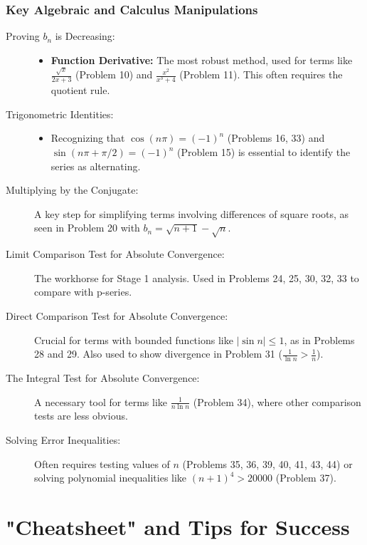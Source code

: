\documentclass{article}
\begin{document}
\section{Key Algebraic and Calculus Manipulations}
\begin{description}
    \item[Proving $b_n$ is Decreasing:]
    \begin{itemize}
        \item \textbf{Function Derivative:} The most robust method, used for terms like $\frac{\sqrt{x}}{2x+3}$ (Problem 10) and $\frac{x^2}{x^3+4}$ (Problem 11). This often requires the quotient rule.
    \end{itemize}
    
    \item[Trigonometric Identities:]
    \begin{itemize}
        \item Recognizing that $\cos(n\pi) = (-1)^n$ (Problems 16, 33) and $\sin(n\pi + \pi/2) = (-1)^n$ (Problem 15) is essential to identify the series as alternating.
    \end{itemize}
    
    \item[Multiplying by the Conjugate:] A key step for simplifying terms involving differences of square roots, as seen in Problem 20 with $b_n = \sqrt{n+1} - \sqrt{n}$.
    
    \item[Limit Comparison Test for Absolute Convergence:] The workhorse for Stage 1 analysis. Used in Problems 24, 25, 30, 32, 33 to compare with p-series.
    
    \item[Direct Comparison Test for Absolute Convergence:] Crucial for terms with bounded functions like $|\sin n| \le 1$, as in Problems 28 and 29. Also used to show divergence in Problem 31 ($\frac{1}{\ln n} > \frac{1}{n}$).
    
    \item[The Integral Test for Absolute Convergence:] A necessary tool for terms like $\frac{1}{n \ln n}$ (Problem 34), where other comparison tests are less obvious.

    \item[Solving Error Inequalities:] Often requires testing values of $n$ (Problems 35, 36, 39, 40, 41, 43, 44) or solving polynomial inequalities like $(n+1)^4 > 20000$ (Problem 37).
\end{description}

\part{"Cheatsheet" and Tips for Success}
\end{document}
